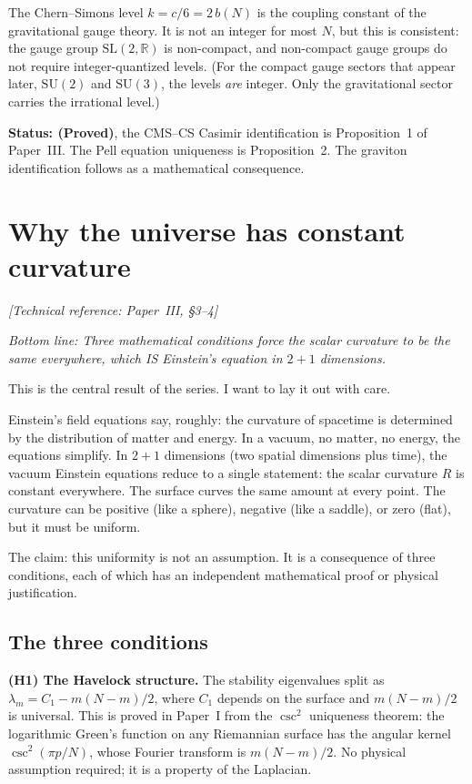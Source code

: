 The Chern--Simons level $k = c/6 = 2\,b(N)$ is the coupling constant of
the gravitational gauge theory. It is not an integer for most $N$, but
this is consistent: the gauge group $\mathrm{SL}(2, \mathbb{R})$ is
non-compact, and non-compact gauge groups do not require integer-quantized
levels. (For the compact gauge sectors that appear later, $\mathrm{SU}(2)$
and $\mathrm{SU}(3)$, the levels \emph{are} integer. Only the
gravitational sector carries the irrational level.)

\textbf{Status: (Proved)}, the CMS--CS Casimir identification is
Proposition~1 of Paper~III. The Pell equation uniqueness is
Proposition~2. The graviton identification follows as a mathematical
consequence.


\section{Why the universe has constant curvature}
\noindent\textit{[Technical reference: Paper~III, \S3--4]}

\medskip

\noindent\textit{Bottom line: Three mathematical conditions force the
scalar curvature to be the same everywhere, which IS Einstein's
equation in $2{+}1$ dimensions.}

\medskip

This is the central result of the series. I want to lay it out with
care.

Einstein's field equations say, roughly: the curvature of spacetime is
determined by the distribution of matter and energy. In a vacuum, no
matter, no energy, the equations simplify. In $2{+}1$ dimensions (two
spatial dimensions plus time), the vacuum Einstein equations reduce to a
single statement: the scalar curvature $R$ is constant everywhere. The
surface curves the same amount at every point. The curvature can be
positive (like a sphere), negative (like a saddle), or zero (flat), but
it must be uniform.

The claim: this uniformity is not an assumption. It is a consequence of
three conditions, each of which has an independent mathematical proof or
physical justification.

\subsection*{The three conditions}

\textbf{(H1) The Havelock structure.} The stability eigenvalues split as
$\lambda_m = C_1 - m(N-m)/2$, where $C_1$ depends on the surface and
$m(N-m)/2$ is universal. This is proved in Paper~I from the $\csc^2$
uniqueness theorem: the logarithmic Green's function on any Riemannian
surface has the angular kernel $\csc^2(\pi p/N)$, whose Fourier
transform is $m(N-m)/2$. No physical assumption required; it is a
property of the Laplacian.

